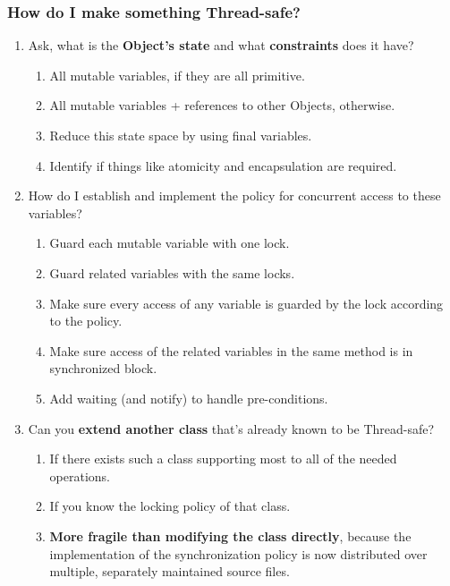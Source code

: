 \documentclass{article}
\begin{document}
\subsubsection{How do I make something Thread-safe?}
\begin{enumerate}
    \item Ask, what is the \textbf{Object's state} and what \textbf{constraints} does it have?
        \begin{enumerate}
            \item All mutable variables, if they are all primitive.
            \item All mutable variables + references to other Objects, otherwise.
            \item Reduce this state space by using final variables.
            \item Identify if things like atomicity and encapsulation are required.
        \end{enumerate}
    \item How do I establish and implement the policy for concurrent access to these variables?
        \begin{enumerate}
            \item Guard each mutable variable with one lock.
            \item Guard related variables with the same locks.
            \item Make sure every access of any variable is guarded by the lock according to the policy.
            \item Make sure access of the related variables in the same method is in synchronized block.
            \item Add waiting (and notify) to handle pre-conditions.
        \end{enumerate}
    \item Can you \textbf{extend another class} that's already known to be Thread-safe?
        \begin{enumerate}
            \item If there exists such a class supporting most to all of the needed operations.
            \item If you know the locking policy of that class.
            \item \textbf{More fragile than modifying the class directly}, because the implementation of the synchronization policy is now distributed over multiple, separately maintained source files.
        \end{enumerate}

\end{enumerate}
\end{document}
